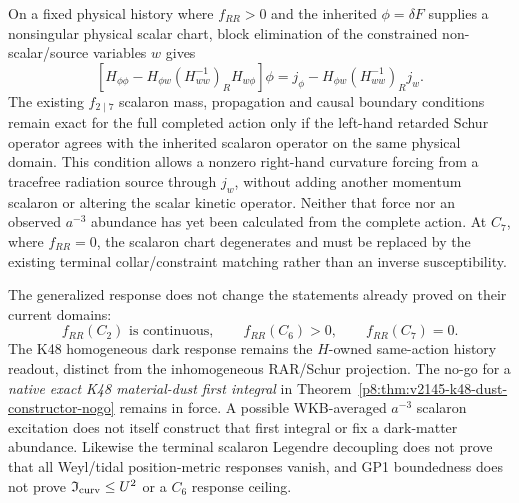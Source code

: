 \documentclass[12pt,a4paper]{article}
\begin{document}
\begin{proposition}
\label{p8:prop:v2166-scalaron-schur-port}
On a fixed physical history where \(f_{RR}>0\) and the inherited
\(\phi=\delta F\) supplies a nonsingular physical scalar chart, block
elimination of the constrained non-scalar/source variables \(w\) gives
\[
 \boxed{\left[H_{\phi\phi}-H_{\phi w}(H_{ww}^{-1})_RH_{w\phi}\right]\phi
 =j_\phi-H_{\phi w}(H_{ww}^{-1})_Rj_w.}
\]
The existing \(f_{2\mid7}\) scalaron mass, propagation and causal
boundary conditions remain exact for the full completed action only
if the left-hand retarded Schur operator agrees with the inherited
scalaron operator on the same physical domain.  This condition allows
a nonzero right-hand curvature forcing from a tracefree radiation
source through \(j_w\), without adding another momentum scalaron
or altering the scalar kinetic operator.  Neither that force nor an
observed \(a^{-3}\) abundance has yet been calculated from the complete
action.  At \(C_7\), where \(f_{RR}=0\), the scalaron chart degenerates
and must be replaced by the existing terminal collar/constraint
matching rather than an inverse susceptibility.
\end{proposition}

\begin{corollary}
\label{p8:cor:v2166-k48-terminal-preservation}
The generalized response does not change the statements already proved on
their current domains:
\[
 f_{RR}(C_2)\text{ is continuous},\qquad
 f_{RR}(C_6)>0,\qquad
 f_{RR}(C_7)=0.
\]
The K48 homogeneous dark response remains the \(H\)-owned same-action
history readout, distinct from the inhomogeneous RAR/Schur projection.  The
no-go for a \emph{native exact K48 material-dust first integral} in
Theorem~\ref{p8:thm:v2145-k48-dust-constructor-nogo} remains in force.
A possible WKB-averaged \(a^{-3}\) scalaron excitation does not itself
construct that first integral or fix a dark-matter abundance.  Likewise the
terminal scalaron Legendre decoupling does not prove that all Weyl/tidal
position-metric responses vanish, and GP1 boundedness does not prove
\(\mathfrak I_{\rm curv}\le U^2\) or a \(C_6\) response ceiling.
\end{corollary}
\end{document}
